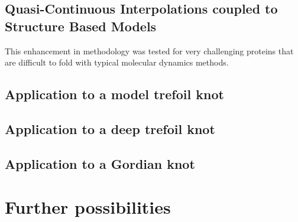 \documentclass[a4paper,11pt]{article}
\begin{document}
\subsection{Quasi-Continuous Interpolations coupled to Structure Based Models}
This enhancement in methodology was tested for very challenging proteins that are difficult to fold with typical molecular dynamics methods.
\subsection{Application to a model trefoil knot}
\subsection{Application to a deep trefoil knot}
\subsection{Application to a Gordian knot}
\section{Further possibilities}
\subsection{}
\section{}




\end{document}
